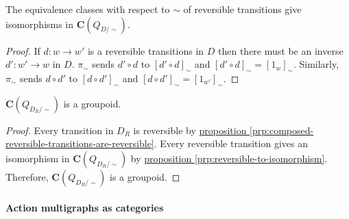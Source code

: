 \begin{proposition}\label{prp:reversible-to-isomorphism}
    The equivalence classes with respect to $\sim$ of reversible transitions give isomorphisms in $\textbf{C}(Q_{D/\sim})$.
\end{proposition}\begin{proof}
    If $d: w \to w'$ is a reversible transitions in $D$ then there must be an inverse $d': w' \to w$ in $D$.
    $\pi_{\sim}$ sends $d' \circ d$ to $[d' \circ d]_{\sim}$ and $[d' \circ d]_{\sim} = [1_{w}]_{\sim}$.
    Similarly, $\pi_{\sim}$ sends $d \circ d'$ to $[d \circ d']_{\sim}$ and $[d \circ d']_{\sim} = [1_{w'}]_{\sim}$.
\end{proof}

\begin{proposition}
    $\textbf{C}(Q_{D_{R}/\sim})$ is a groupoid.
\end{proposition}\begin{proof}
    Every transition in $D_{R}$ is reversible by \hyperref[prp:composed-reversible-transitions-are-reversible]{proposition \ref*{prp:composed-reversible-transitions-are-reversible}}.
    Every reversible transition gives an isomorphism in $\textbf{C}(Q_{D_{R}/\sim})$ by \hyperref[prp:reversible-to-isomorphism]{proposition \ref*{prp:reversible-to-isomorphism}}.
    Therefore, $\textbf{C}(Q_{D_{R}/\sim})$ is a groupoid.
\end{proof}


\paragraph{Action multigraphs as categories}

